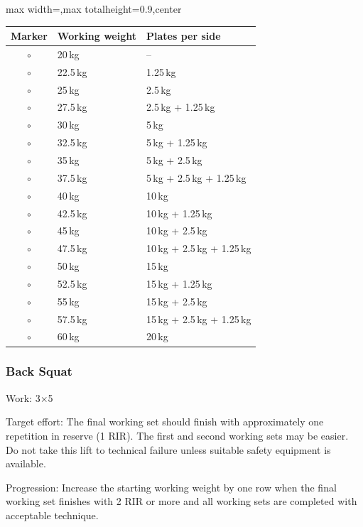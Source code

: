 \documentclass[11pt,a4paper]{article}
\newcommand{\tablearraystretch}{1.15}
\begin{document}
\begin{center}
\renewcommand{\arraystretch}{\tablearraystretch}
\begin{adjustbox}{max width=\linewidth,max totalheight=0.9\textheight,center}
\begin{tabular}{cll}
\toprule
Marker & Working weight & Plates per side \\
\midrule
$\circ$ & 20\,kg & -- \\
$\circ$ & 22.5\,kg & 1.25\,kg \\
$\circ$ & 25\,kg & 2.5\,kg \\
$\circ$ & 27.5\,kg & 2.5\,kg + 1.25\,kg \\
$\circ$ & 30\,kg & 5\,kg \\
$\circ$ & 32.5\,kg & 5\,kg + 1.25\,kg \\
$\circ$ & 35\,kg & 5\,kg + 2.5\,kg \\
$\circ$ & 37.5\,kg & 5\,kg + 2.5\,kg + 1.25\,kg \\
$\circ$ & 40\,kg & 10\,kg \\
$\circ$ & 42.5\,kg & 10\,kg + 1.25\,kg \\
$\circ$ & 45\,kg & 10\,kg + 2.5\,kg \\
$\circ$ & 47.5\,kg & 10\,kg + 2.5\,kg + 1.25\,kg \\
$\circ$ & 50\,kg & 15\,kg \\
$\circ$ & 52.5\,kg & 15\,kg + 1.25\,kg \\
$\circ$ & 55\,kg & 15\,kg + 2.5\,kg \\
$\circ$ & 57.5\,kg & 15\,kg + 2.5\,kg + 1.25\,kg \\
$\circ$ & 60\,kg & 20\,kg \\
\bottomrule
\end{tabular}
\end{adjustbox}
\renewcommand{\arraystretch}{1}
\end{center}

\newpage
\subsubsection{Back Squat}

Work: 3$\times$5

Target effort: The final working set should finish with approximately one repetition in reserve (1 RIR). The first and second working sets may be easier. Do not take this lift to technical failure unless suitable safety equipment is available.

Progression: Increase the starting working weight by one row when the final working set finishes with 2 RIR or more and all working sets are completed with acceptable technique.
\end{document}

